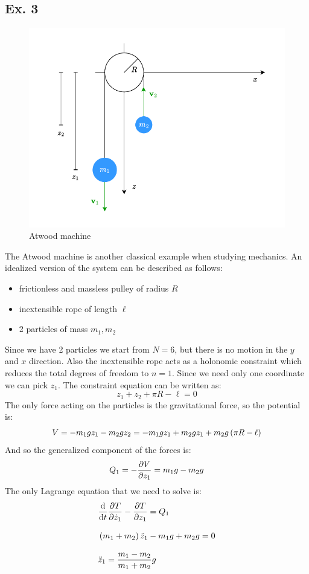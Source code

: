 \subsection{\textbf{Ex. 3}}
\begin{figure}[H]
    \centering
    \includegraphics[width=0.7\linewidth]{res/svg/atwood_machine.drawio}
    \caption{Atwood machine}
\end{figure}
The Atwood machine is another classical example when studying mechanics. An idealized version of the system can be described as follows:
\begin{itemize}
  \item frictionless and massless pulley of radius $R$
  \item inextensible rope of length $\ell$
  \item 2 particles of mass $m_1, m_2$
\end{itemize}
Since we have 2 particles we start from $N = 6$, but there is no motion in the $y$ and $x$ direction. Also the inextensible rope acts as a holonomic constraint which reduces the total degrees of freedom to $n = 1$. Since we need only one coordinate we can pick $z_1$. The constraint equation can be written as:
\begin{equation}
  z_1 + z_2 + \pi R - \ell = 0
\end{equation}
The only force acting on the particles is the gravitational force, so the potential is:
\begin{equation}
  V = -m_1gz_1 - m_2gz_2 = -m_1gz_1 + m_2gz_1 + m_2g\left(\pi R - \ell\right)
\end{equation}
And so the generalized component of the forces is:
\begin{equation}
  Q_1 = -\pdv{V}{z_1} = m_1g - m_2g \\[8pt]
\end{equation}
The only Lagrange equation that we need to solve is:
\begin{equation}
  \begin{split}
    &\dv{}{t}\pdv{T}{\dot{z}_1} - \pdv{T}{z_1} = Q_1 \\[8pt]
    &\brackets{m_1 + m_2}\ddot{z}_1 - m_1g + m_2g = 0 \\[8pt]
    &\ddot{z}_1 = \dfrac{m_1 - m_2}{m_1 + m_2}g
  \end{split}
\end{equation}
